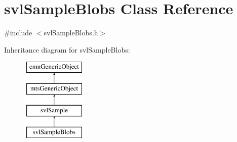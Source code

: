 \hypertarget{classsvl_sample_blobs}{}\section{svl\+Sample\+Blobs Class Reference}
\label{classsvl_sample_blobs}


{\ttfamily \#include $<$svl\+Sample\+Blobs.\+h$>$}

Inheritance diagram for svl\+Sample\+Blobs\+:\begin{figure}[H]
\begin{center}
\leavevmode
\includegraphics[height=4.000000cm]{d4/dda/classsvl_sample_blobs}
\end{center}
\end{figure}
